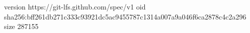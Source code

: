 version https://git-lfs.github.com/spec/v1
oid sha256:bff261db271c333c93921dc5ac9455787c1314a007a9a046f6ca2878c4c2a296
size 287155
